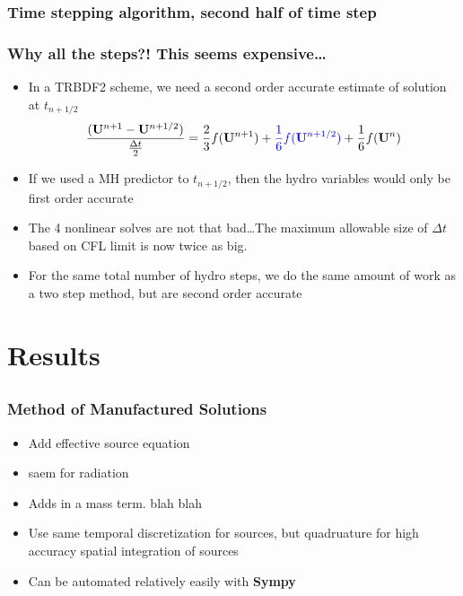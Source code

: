 \documentclass[xcolor=dvipsnames,fontsize=8pt]{beamer}
\newcommand{\BU}[0]{\ensuremath{\mathbf{U}}}
\newcommand{\coly}[1]{{\color{yellow} #1}}
\newcommand{\colb}[1]{{\color{blue} #1}}
\newlength{\wideitemsep}
\let\olditem\item
\renewcommand{\item}{\setlength{\itemsep}{\wideitemsep}\olditem}
\newcommand{\Dt}{\Delta t}
\begin{document}
\begin{frame}
    \frametitle{Time stepping algorithm, \coly{second half} of time step}
    \begin{figure}[h]
        \centering
        
    \end{figure}
\end{frame}

\begin{frame}
    \frametitle{Why all the steps?! This seems expensive\ldots}
    \begin{itemize}
        \item In a TRBDF2 scheme, we need a second order accurate estimate of solution
            at $t_{n+1/2}$ 
            \begin{equation*}
            \frac{(\BU^{n+1} - \BU^{n+1/2})}{\frac{\Dt}{2}} = \frac{2}{3}f(\BU^{n+1})
        + \colb{\frac{1}{6}f(\BU^{n+1/2})}+ \frac{1}{6}f(\BU^{n})
            \end{equation*}
        \item If we used a MH predictor to $t_{n+1/2}$, then the hydro variables
            would only be first order accurate
        \item The 4 nonlinear solves are not that bad\ldots The maximum allowable size of $\Dt$ based on CFL limit is
            now twice as big.  
        \item For the same total number of hydro steps, we do the same amount of work as a two step method, but are \colb{second order accurate}
    \end{itemize}
\end{frame}

\section{Results}
\subsection{}

\begin{frame}
    \frametitle{Method of Manufactured Solutions}
    \begin{itemize}
        \item Add effective source equation
        \item saem for radiation
        \item Adds in a mass term. blah blah
        \item Use same temporal discretization for sources, but quadruature for high
            accuracy spatial integration of sources 
        \item Can be automated relatively easily with \textbf{Sympy}
    \end{itemize}
\end{frame}
\end{document}
